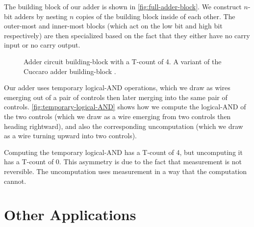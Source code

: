 \documentclass[twocolumn]{revtex4-1}
\begin{document}
The building block of our adder is shown in \autoref{fig:full-adder-block}.
We construct $n$-bit adders by nesting $n$ copies of the building block inside of each other.
The outer-most and inner-most blocks (which act on the low bit and high bit respectively) are then specialized based on the fact that they either have no carry input or no carry output.

\begin{figure}
  \caption{
	Adder circuit building-block with a T-count of 4.
	A variant of the Cuccaro adder building-block \citep{Cuccaro2004}.
  }
  \label{fig:full-adder-block}
\end{figure}

Our adder uses temporary logical-AND operations, which we draw as wires emerging out of a pair of controls then later merging into the same pair of controls.
\autoref{fig:temporary-logical-AND} shows how we compute the logical-AND of the two controls (which we draw as a wire emerging from two controls then heading rightward), and also the corresponding uncomputation (which we draw as a wire turning upward into two controls).

Computing the temporary logical-AND has a T-count of 4, but uncomputing it has a T-count of 0.
This asymmetry is due to the fact that measurement is not reversible.
The uncomputation uses measurement in a way that the computation cannot.


\section{Other Applications}
\label{sec:other-applications}
\end{document}
